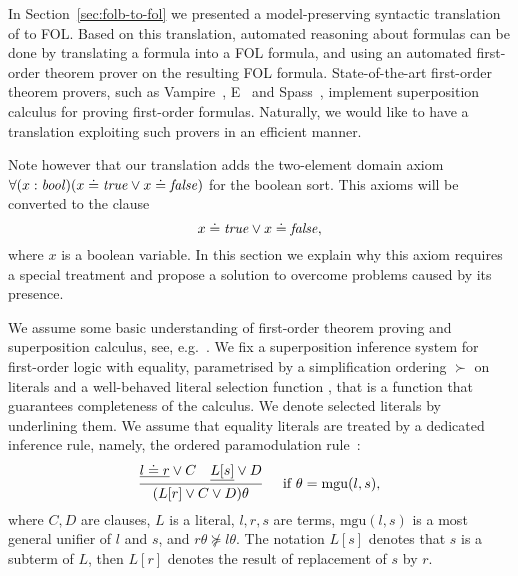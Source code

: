 In
Section~\ref{sec:folb-to-fol} we presented a model-preserving
syntactic translation of \folb{} to FOL.
Based on this translation, automated reasoning about \folb{} formulas
can be done by translating a \folb{} formula into a FOL
formula, and using an automated first-order theorem prover on the resulting FOL formula.
State-of-the-art first-order theorem provers, such as Vampire~\cite{Vampire13}, E~\cite{E13} and
Spass~\cite{Spass}, implement superposition calculus for proving first-order formulas. Naturally, we would like to have a translation exploiting such provers in an efficient manner.

Note however that our translation adds the two-element domain axiom
$\forall (x:\mathit{bool})\allowbreak(x \doteq \mathit{true} \vee x \doteq \mathit{false})$ for the boolean sort. This axioms will be converted to the clause
\begin{equation}\label{clause:T|F}
  x \doteq \mathit{true} \vee x \doteq \mathit{false},
\end{equation}
where $x$ is a boolean variable. In this section we
explain why this axiom requires a special treatment and propose a solution to overcome problems caused by its presence.
%

We assume some basic understanding of first-order theorem proving and superposition calculus, see, e.g.~\cite{Ganzinger01,NieuwenhuisRubio:HandbookAR:paramodulation:2001}. We fix a superposition inference system for first-order logic with equality, parametrised by a simplification ordering $\succ$ on literals and a well-behaved literal selection function \cite{Vampire13}, that is a function that guarantees completeness of the calculus. We denote selected literals by underlining them. We assume that equality literals are treated by a dedicated inference rule, namely, the ordered paramodulation rule~\cite{Robinson1969}:
\[
\infer[\quad\text{if}\ \theta = \mathrm{mgu}(l, s),]{(L[r] \vee C \vee D)\theta}%
{\underline{l \eql r} \vee C & \underline{L[s]} \vee D}
\]
where $C,D$ are clauses, $L$ is a literal, $l,r,s$ are terms, $\mathrm{mgu}(l, s)$ is a most general unifier of $l$ and $s$, and $r\theta \not\succeq l\theta$.
The notation $L[s]$ denotes that $s$ is a subterm of $L$, then $L[r]$ denotes the result of replacement of $s$ by $r$.

